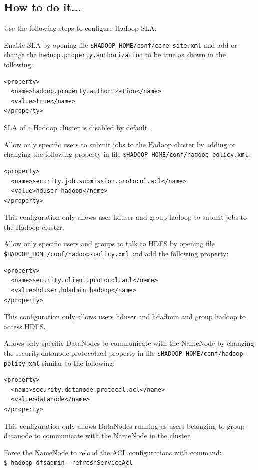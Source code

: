 \subsection*{How to do it...}
Use the following steps to configure Hadoop SLA:

Enable SLA by opening file \verb|$HADOOP_HOME/conf/core-site.xml| and add or change the \verb|hadoop.property.authorization| to be true as shown in the following:
\lstset{style=bashstyle}
\begin{lstlisting}
<property>
  <name>hadoop.property.authorization</name>
  <value>true</name>
</property>
\end{lstlisting}

SLA of a Hadoop cluster is disabled by default.

Allow only specific users to submit jobs to the Hadoop cluster by adding or changing the following property in file \verb|$HADOOP_HOME/conf/hadoop-policy.xml|:
\lstset{style=bashstyle}
\begin{lstlisting}
<property>
  <name>security.job.submission.protocol.acl</name>
  <value>hduser hadoop</name>
</property>
\end{lstlisting}

This configuration only allows user hduser and group hadoop to submit jobs to the Hadoop cluster.

Allow only specific users and groups to talk to HDFS by opening file \verb|$HADOOP_HOME/conf/hadoop-policy.xml| and add the following property:
\lstset{style=bashstyle}
\begin{lstlisting}
<property>
  <name>security.client.protocol.acl</name>
  <value>hduser,hdadmin hadoop</name>
</property>
\end{lstlisting}

This configuration only allows users hduser and hdadmin and group hadoop to access HDFS.

Allows only specific DataNodes to communicate with the NameNode by changing the security.datanode.protocol.acl property in file \verb|$HADOOP_HOME/conf/hadoop-policy.xml| similar to the following:
\lstset{style=bashstyle}
\begin{lstlisting}
<property>
  <name>security.datanode.protocol.acl</name>
  <value>datanode</name>
</property>
\end{lstlisting}

This configuration only allows DataNodes running as users belonging to group datanode to communicate with the NameNode in the cluster.

Force the NameNode to reload the ACL configurations with command: \\
\verb|$ hadoop dfsadmin -refreshServiceAcl| \\

